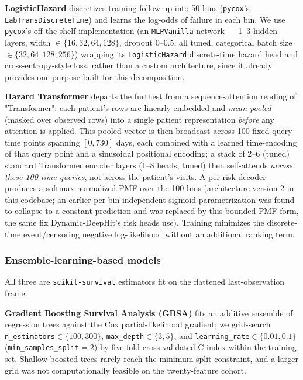 \documentclass[10pt,letterpaper]{article}
\begin{document}
\textbf{LogisticHazard} discretizes training follow-up into 50 bins (\texttt{pycox}'s \texttt{LabTransDiscreteTime}) and learns the log-odds of failure in each bin. We use \texttt{pycox}'s off-the-shelf implementation (an \texttt{MLPVanilla} network — 1--3 hidden layers, width $\in\{16,32,64,128\}$, dropout 0--0.5, all tuned, categorical batch size $\in\{32,64,128,256\}$) wrapping its \texttt{LogisticHazard} discrete-time hazard head and cross-entropy-style loss, rather than a custom architecture, since it already provides one purpose-built for this decomposition.

\textbf{Hazard Transformer} \cite{hazard_transformer,vaswani2017attention} departs the furthest from a sequence-attention reading of "Transformer": each patient's rows are linearly embedded and \emph{mean-pooled} (masked over observed rows) into a single patient representation \emph{before} any attention is applied. This pooled vector is then broadcast across 100 fixed query time points spanning $[0,730]$ days, each combined with a learned time-encoding of that query point and a sinusoidal positional encoding; a stack of 2--6 (tuned) standard Transformer encoder layers (1--8 heads, tuned) then self-attends \emph{across these 100 time queries}, not across the patient's visits. A per-risk decoder produces a softmax-normalized PMF over the 100 bins (architecture version 2 in this codebase; an earlier per-bin independent-sigmoid parametrization was found to collapse to a constant prediction and was replaced by this bounded-PMF form, the same fix Dynamic-DeepHit's risk heads use). Training minimizes the discrete-time event/censoring negative log-likelihood without an additional ranking term.

\subsubsection*{Ensemble-learning-based models}
All three are \texttt{scikit-survival} \cite{polsterl2020sksurv} estimators fit on the flattened last-observation frame.

\textbf{Gradient Boosting Survival Analysis (GBSA)} \cite{chen2013gradient_GBSA} fits an additive ensemble of regression trees against the Cox partial-likelihood gradient; we grid-search \texttt{n\_estimators}$\in\{100,300\}$, \texttt{max\_depth}$\in\{3,5\}$, and \texttt{learning\_rate}$\in\{0.01,0.1\}$ (\texttt{min\_samples\_split}$=2$) by five-fold cross-validated C-index within the training set. Shallow boosted trees rarely reach the minimum-split constraint, and a larger grid was not computationally feasible on the twenty-feature cohort.
\end{document}
